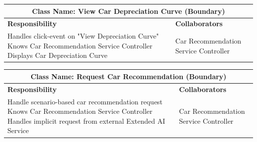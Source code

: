 \documentclass[]{article}
\begin{document}
\begin{itemize}
\begin{table}[H]
\begin{tabular}{|p{6cm}|p{6cm}|}
            \end{tabular}
        \end{table}
        \begin{table}[H]
            \centering
            \renewcommand{\arraystretch}{1.3} %
            \begin{tabular}{|p{6cm}|p{6cm}|} 
            \hline
            \multicolumn{2}{|c|}{\textbf{Class Name: View Car Depreciation Curve (Boundary)}} \\ 
            \hline
            \textbf{Responsibility} & \textbf{Collaborators} \\ 
            \hline
            Handles click-event on "View Depreciation Curve" \newline
            Knows Car Recommendation Service Controller \newline
            Displays Car Depreciation Curve & Car Recommendation Service Controller \\ 
            \hline
            \end{tabular}
        \label{tab:crc_card}
        \end{table}   
        \begin{table}[H]
            \centering
            \renewcommand{\arraystretch}{1.3} %
            \begin{tabular}{|p{6cm}|p{6cm}|} 
            \hline
            \multicolumn{2}{|c|}{\textbf{Class Name: Request Car Recommendation (Boundary)}} \\ 
            \hline
            \textbf{Responsibility} & \textbf{Collaborators} \\ 
            \hline
            Handle scenario-based car recommendation request \newline
            Knows Car Recommendation Service Controller \newline
            Handles implicit request from external Extended AI Service & Car Recommendation Service Controller \\ 
            \hline
            \end{tabular}
            \label{tab:crc_card}
        \end{table}
            

\end{itemize}
\end{document}
